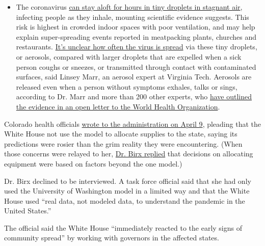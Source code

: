 \begin{itemize}
  \begin{itemize}
  \tightlist
  \item
    The coronavirus
    \href{https://www.nytimes.com/2020/07/04/health/239-experts-with-one-big-claim-the-coronavirus-is-airborne.html?action=click\&pgtype=Article\&state=default\&region=MAIN_CONTENT_3\&context=storylines_faq}{can
    stay aloft for hours in tiny droplets in stagnant air}, infecting
    people as they inhale, mounting scientific evidence suggests. This
    risk is highest in crowded indoor spaces with poor ventilation, and
    may help explain super-spreading events reported in meatpacking
    plants, churches and restaurants.
    \href{https://www.nytimes.com/2020/07/06/health/coronavirus-airborne-aerosols.html?action=click\&pgtype=Article\&state=default\&region=MAIN_CONTENT_3\&context=storylines_faq}{It's
    unclear how often the virus is spread} via these tiny droplets, or
    aerosols, compared with larger droplets that are expelled when a
    sick person coughs or sneezes, or transmitted through contact with
    contaminated surfaces, said Linsey Marr, an aerosol expert at
    Virginia Tech. Aerosols are released even when a person without
    symptoms exhales, talks or sings, according to Dr. Marr and more
    than 200 other experts, who
    \href{https://academic.oup.com/cid/article/doi/10.1093/cid/ciaa939/5867798}{have
    outlined the evidence in an open letter to the World Health
    Organization}.
  \end{itemize}
\end{itemize}

Colorado health officials
\href{https://documentingcovid19.io/uploads/DHS\%20HHS\%20ventilator\%20usage\%20by\%20state\%20April\%2012.pdf}{wrote
to the administration on April 9}, pleading that the White House not use
the model to allocate supplies to the state, saying its predictions were
rosier than the grim reality they were encountering. (When those
concerns were relayed to her,
\href{https://www.documentcloud.org/documents/6994649-2020-04-13-Colorado-Re-Birx-IHME-Colorado-FOIA.html}{Dr.
Birx replied} that decisions on allocating equipment were based on
factors beyond the one model.)

Dr. Birx declined to be interviewed. A task force official said that she
had only used the University of Washington model in a limited way and
that the White House used ``real data, not modeled data, to understand
the pandemic in the United States.''

The official said the White House ``immediately reacted to the early
signs of community spread'' by working with governors in the affected
states.

